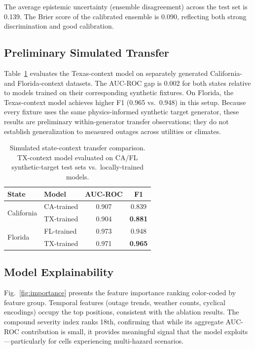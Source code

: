 \documentclass[conference]{IEEEtran}
\begin{document}
The average epistemic uncertainty (ensemble disagreement) across the test set is 0.139. The Brier score of the calibrated ensemble is 0.090, reflecting both strong discrimination and good calibration.

\subsection{Preliminary Simulated Transfer}

Table~\ref{tab:crossstate} evaluates the Texas-context model on separately generated California- and Florida-context datasets. The AUC-ROC gap is 0.002 for both states relative to models trained on their corresponding synthetic fixtures. On Florida, the Texas-context model achieves higher F1 (0.965 vs.\ 0.948) in this setup. Because every fixture uses the same physics-informed synthetic target generator, these results are preliminary within-generator transfer observations; they do not establish generalization to measured outages across utilities or climates.

\begin{table}[t]
\centering
\caption{Simulated state-context transfer comparison. TX-context model evaluated on CA/FL synthetic-target test sets vs.\ locally-trained models.}
\label{tab:crossstate}
\begin{tabular}{@{}llcc@{}}
\toprule
\textbf{State} & \textbf{Model} & \textbf{AUC-ROC} & \textbf{F1} \\
\midrule
\multirow{2}{*}{California} & CA-trained & 0.907 & 0.839 \\
 & TX-trained & 0.904 & \textbf{0.881} \\
\midrule
\multirow{2}{*}{Florida} & FL-trained & 0.973 & 0.948 \\
 & TX-trained & 0.971 & \textbf{0.965} \\
\bottomrule
\end{tabular}
\end{table}

\subsection{Model Explainability}

Fig.~\ref{fig:importance} presents the feature importance ranking color-coded by feature group. Temporal features (outage trends, weather counts, cyclical encodings) occupy the top positions, consistent with the ablation results. The compound severity index ranks 18th, confirming that while its aggregate AUC-ROC contribution is small, it provides meaningful signal that the model exploits---particularly for cells experiencing multi-hazard scenarios.
\end{document}
